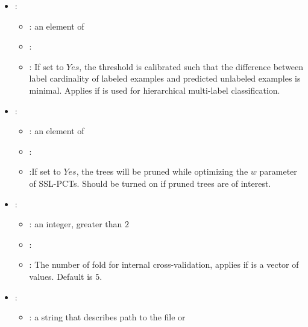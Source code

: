 \begin{itemize}
\begin{itemize}
\begin{itemize}
                \end{itemize} 
           \end{itemize}
    \item {}:
           \begin{itemize}
                \item \optionPossibleValues{}:  an element of 
                \item \optionDefaultValue{}: 
                \item \optionDescrption{}: If set to $Yes$, the threshold is calibrated such that the difference between label cardinality of labeled examples and predicted unlabeled examples is minimal.
                Applies if  is used for hierarchical multi-label classification.
           \end{itemize}
    \item {}:
           \begin{itemize}
                \item \optionPossibleValues{}: an element of 
                \item \optionDefaultValue{}: 
                \item \optionDescrption{}:If set to $Yes$, the trees will be pruned while optimizing the $w$ parameter of SSL-PCTs. Should be turned on if pruned trees are of interest.
           \end{itemize}
    \item {}:
           \begin{itemize}
                \item \optionPossibleValues{}: an integer, greater than $2$
                \item \optionDefaultValue{}: 
                \item \optionDescrption{}: The number of fold for internal cross-validation, applies if  is a vector of values. Default is $5$.
           \end{itemize}
    \item {}:
           \begin{itemize}
                \item \optionPossibleValues{}:  a string that describes path to the file or 

\end{itemize}
\end{itemize}
